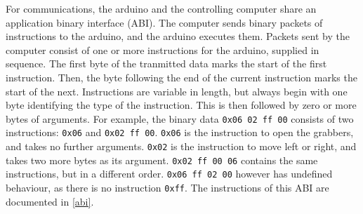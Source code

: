 For communications, the arduino and the controlling computer share an application binary
interface (ABI). The computer sends binary packets of instructions to the
arduino, and the arduino executes them. Packets sent by the computer consist
of one or more instructions for the arduino, supplied in sequence. The first
byte of the tranmitted data marks the start of the first instruction. Then, the
byte following the end of the current instruction marks the start of the next.
Instructions are variable in length, but always begin with one byte identifying
the type of the instruction. This is then followed by zero or more bytes of
arguments. For example, the binary data \texttt{0x06 02 ff 00} consists of two
instructions: \texttt{0x06} and \texttt{0x02 ff 00}. \texttt{0x06} is the
instruction to open the grabbers, and takes no further arguments. \texttt{0x02}
is the instruction to move left or right, and takes two more bytes as its
argument. \texttt{0x02 ff 00 06} contains the same instructions, but in a
different order. \texttt{0x06 ff 02 00} however has undefined behaviour, as
there is no instruction \texttt{0xff}. The instructions of this ABI are
documented in \autoref{abi}.
